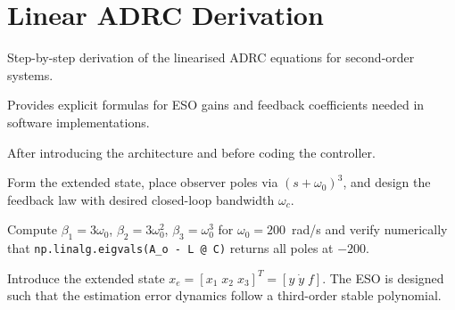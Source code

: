 \section{Linear ADRC Derivation}
\begin{beginnerguide}
    \item[\textbf{What?}] Step-by-step derivation of the linearised ADRC equations for second-order systems.
    \item[\textbf{Why?}] Provides explicit formulas for ESO gains and feedback coefficients needed in software implementations.
    \item[\textbf{When?}] After introducing the architecture and before coding the controller.
    \item[\textbf{How?}] Form the extended state, place observer poles via $(s+\omega_0)^3$, and design the feedback law with desired closed-loop bandwidth $\omega_c$.
    \item[\textbf{Example}] Compute $\beta_1=3\omega_0$, $\beta_2=3\omega_0^2$, $\beta_3=\omega_0^3$ for $\omega_0=200$~rad/s and verify numerically that \texttt{np.linalg.eigvals(A\_o - L @ C)} returns all poles at $-200$.
\end{beginnerguide}
Introduce the extended state $x_e = [x_1\; x_2\; x_3]^T = [y\; \dot{y}\; f]$. The ESO is designed such that the estimation error dynamics follow a third-order stable polynomial.
